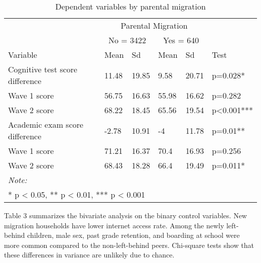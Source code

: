 \documentclass[
  man,floatsintext]{apa7}
\begin{document}
\begin{table}

\caption{\label{tab:unnamed-chunk-2}Dependent variables by parental migration}
\centering
\begin{tabular}[t]{llllll}
\toprule
\multicolumn{1}{c}{ } & \multicolumn{4}{c}{Parental Migration} \\
\cmidrule(l{3pt}r{3pt}){2-5}
\multicolumn{1}{c}{ } & \multicolumn{2}{c}{No = 3422} & \multicolumn{2}{c}{Yes = 640} \\
\cmidrule(l{3pt}r{3pt}){2-3} \cmidrule(l{3pt}r{3pt}){4-5}
Variable & Mean & Sd & Mean & Sd & Test\\
\midrule
Cognitive test score difference & 11.48 & 19.85 & 9.58 & 20.71 & p=0.028*\\
\hspace{1em}Wave 1 score & 56.75 & 16.63 & 55.98 & 16.62 & p=0.282\\
\hspace{1em}Wave 2 score & 68.22 & 18.45 & 65.56 & 19.54 & p<0.001***\\
Academic exam score difference & -2.78 & 10.91 & -4 & 11.78 & p=0.01**\\
\hspace{1em}Wave 1 score & 71.21 & 16.37 & 70.4 & 16.93 & p=0.256\\
\addlinespace
\hspace{1em}Wave 2 score & 68.43 & 18.28 & 66.4 & 19.49 & p=0.011*\\
\bottomrule
\multicolumn{6}{l}{\rule{0pt}{1em}\textit{Note: }}\\
\multicolumn{6}{l}{\rule{0pt}{1em}* p < 0.05, ** p < 0.01, *** p < 0.001}\\
\end{tabular}
\end{table}

\newpage

Table 3 summarizes the bivariate analysis on the binary control variables. New migration households have lower internet access rate. Among the newly left-behind children, male sex, past grade retention, and boarding at school were more common compared to the non-left-behind peers. Chi-square tests show that these differences in variance are unlikely due to chance.
\end{document}
